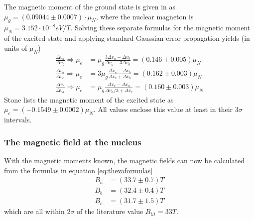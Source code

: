 The magnetic moment of the ground state is given in \cite{stone} as $\mu_g=(0.09044\pm0.0007)\cdot\mu_N$, where the nuclear magneton is $\mu_N=\unit{3.152\cdot10^{-8}}{eV/T}$. Solving these separate formulas for the magnetic moment of the excited state and applying standard Gaussian error propagation yields (in units of $\mu_N$)
\begin{align}
\frac{\Delta v_a}{\Delta v_b}\Rightarrow \mu_e&=\mu_g\frac{3\Delta v_a-\Delta v_b}{\Delta v_a-3\Delta v_b}=\unit{(0.146\pm0.005)}{\mu_N}\\
\frac{\Delta v_b}{\Delta v_c}\Rightarrow\mu_e&=3\mu_g\frac{\Delta v_c-\Delta v_b}{\Delta v_c+\Delta v_b}=\unit{(0.162\pm0.003)}{\mu_N}\\
\frac{\Delta v_c}{\Delta v_a}\Rightarrow\mu_e&=\mu_g\frac{\Delta v_c-\Delta v_a}{\Delta v_a/3+\Delta v_c}=\unit{(0.160\pm0.003)}{\mu_N}
\end{align}
Stone \cite{stone} lists the magnetic moment of the excited state as $\mu_e=\unit{(-0.1549\pm0.0002)}{\mu_N}$.
All values enclose this value at least in their $3\sigma$ intervals. 

\subsubsection{The magnetic field at the nucleus}
With the magnetic moments known, the magnetic fields can now be calculated from the formulas in equation \ref{eq:thevaformulas}
\begin{align}
	B_a&=\unit{(33.7\pm0.7)}{T}\\
	B_b&=\unit{(32.4\pm0.4)}{T}\\
	B_c&=\unit{(31.7\pm1.5)}{T}
\end{align}
which are all within $2\sigma$ of the literature value $B_{lit}=\unit{33}{T}$\cite{Fultz}.
